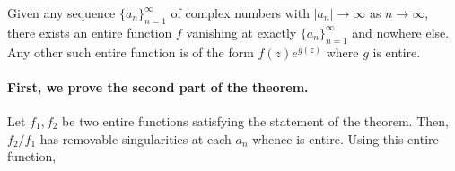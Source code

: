 \begin{theorem}[Weierstrass]
    Given any sequence $\{a_n\}_{n = 1}^\infty$ of complex numbers with $|a_n|\to\infty$ as $n\to\infty$, there exists an entire function $f$ vanishing at exactly $\{a_n\}_{n = 1}^\infty$ and nowhere else. Any other such entire function is of the form $f(z)e^{g(z)}$ where $g$ is entire.
\end{theorem}

\paragraph{First, we prove the second part of the theorem.} Let $f_1,f_2$ be two entire functions satisfying the statement of the theorem. Then, $f_2/f_1$ has removable singularities at each $a_n$ whence is entire. Using this entire function, 